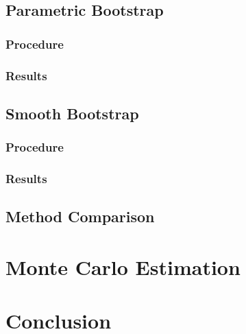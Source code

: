 \documentclass[12pt]{article}
\begin{document}
\newpage
\subsection{Parametric Bootstrap}
\subsubsection*{Procedure}
\subsubsection*{Results}

\subsection{Smooth Bootstrap}
\subsubsection*{Procedure}
\subsubsection*{Results}

\subsection{Method Comparison}


\newpage
\section{Monte Carlo Estimation}

\newpage
\section{Conclusion}


 
\end{document}
